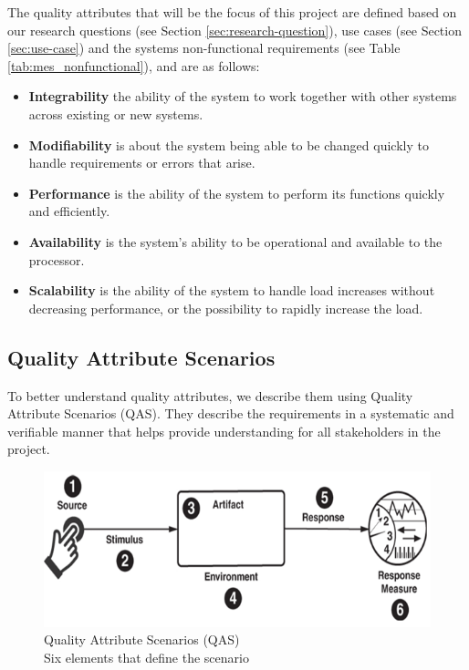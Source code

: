 The quality attributes that will be the focus of this project are defined based on our research questions (see Section \ref{sec:research-question}), use cases (see Section \ref{sec:use-case}) and the systems non-functional requirements (see Table \ref{tab:mes_nonfunctional}), and are as follows:
\begin{itemize}
    \item \textbf{Integrability} the ability of the system to work together with other systems across existing or new systems.
    \item \textbf{Modifiability} is about the system being able to be changed quickly to handle requirements or errors that arise.
    \item \textbf{Performance} is the ability of the system to perform its functions quickly and efficiently.
    \item \textbf{Availability} is the system's ability to be operational and available to the processor.
     \item \textbf{Scalability} is the ability of the system to handle load increases without decreasing performance, or the possibility to rapidly increase the load.
\end{itemize}





\subsection{Quality Attribute Scenarios}
To better understand quality attributes, we describe them using Quality Attribute Scenarios (QAS). They describe the requirements in a systematic and verifiable manner that helps provide understanding for all stakeholders in the project.

\begin{figure}[H]
    \centering
    \caption{\centering Quality Attribute Scenarios (QAS) \\ Six elements that define the scenario}
    \label{fig:qas-diagram}
    \includegraphics[width=0.93\linewidth]{report/GroupTemplate/images/qas.png} 
\end{figure}


